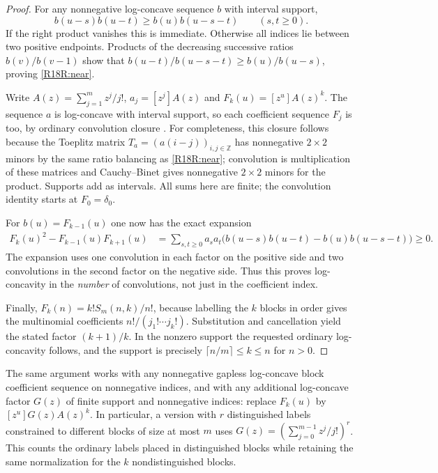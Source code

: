 \documentclass[11pt,a4paper]{article}
\begin{document}
\begin{proof}
For any nonnegative log-concave sequence $b$ with interval support,
\begin{equation}\label{R18R:near}
 b(u-s)b(u-t)\ge b(u)b(u-s-t)\qquad(s,t\ge0).
\end{equation}
If the right product vanishes this is immediate. Otherwise all indices
lie between two positive endpoints. Products of the decreasing successive
ratios $b(v)/b(v-1)$ show that
$b(u-t)/b(u-s-t)\ge b(u)/b(u-s)$, proving \eqref{R18R:near}.

Write $A(z)=\sum_{j=1}^{m} z^j/j!$, $a_j=[z^j]A(z)$ and
$F_k(u)=[z^u]A(z)^k$. The sequence $a$ is log-concave with
interval support, so each coefficient sequence $F_j$ is too, by ordinary
convolution closure \cite{R18R:Menon}. For completeness, this closure follows
because the Toeplitz matrix $T_a=(a(i-j))_{i,j\in\mathbb Z}$ has
nonnegative $2\times 2$ minors by the same ratio balancing as
\eqref{R18R:near}; convolution is multiplication of these matrices and
Cauchy--Binet gives nonnegative $2\times2$ minors for the product.
Supports add as intervals. All sums here are finite; the convolution
identity starts at $F_0=\delta_0$.

For $b(u)=F_{k-1}(u)$ one now has the exact expansion
\begin{align*}
F_k(u)^2 - F_{k-1}(u)F_{k+1}(u)
 &=\sum_{s,t\ge0}a_s a_t
    \bigl(b(u-s)b(u-t)-b(u)b(u-s-t)\bigr)\ge0.
\end{align*}
The expansion uses one convolution in each factor on the positive side
and two convolutions in the second factor on the negative side. Thus
this proves log-concavity in the \emph{number} of convolutions, not just
in the coefficient index.

Finally, $F_k(n)=k!S_m(n,k)/n!$, because labelling the $k$ blocks
in order gives the multinomial coefficients $n!/(j_1!\cdots j_k!)$.
Substitution and cancellation yield the stated factor $(k+1)/k$.
In the nonzero support the requested ordinary log-concavity follows,
and the support is precisely $\lceil n/m\rceil\le k\le n$ for $n>0$.
\end{proof}

The same argument works with any nonnegative gapless log-concave block
coefficient sequence on nonnegative indices, and with any additional
log-concave factor $G(z)$ of finite support and nonnegative indices:
replace $F_k(u)$ by $[z^u]G(z)A(z)^k$. In particular, a version with $r$
distinguished labels constrained to different blocks of size at most $m$
uses $G(z)=(\sum_{j=0}^{m-1}z^j/j!)^r$. This counts the ordinary labels
placed in distinguished blocks while retaining the same normalization
for the $k$ nondistinguished blocks.
\end{document}

